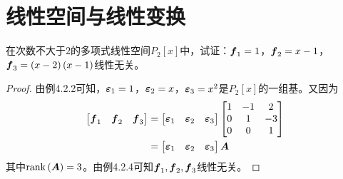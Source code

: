 \section{线性空间与线性变换}

\begin{problem}
在次数不大于\(2\)的多项式线性空间\(P_2[x]\)中，试证：\(\boldsymbol{f}_1=1\)，\(\boldsymbol{f}_2=x-1\)，\(\boldsymbol{f}_3=\left( x-2 \right)\left( x-1 \right)\)线性无关。
\end{problem}
\begin{proof}
    由例4.2.2可知，\(\boldsymbol{\varepsilon}_1=1\)，\(\boldsymbol{\varepsilon}_2=x\)，\(\boldsymbol{\varepsilon}_3=x^2\)是\(P_2[x]\)的一组基。又因为
    \begin{align*}
        \begin{bmatrix}
            \boldsymbol{f}_1 & \boldsymbol{f}_2 & \boldsymbol{f}_3
        \end{bmatrix}
         & =
        \begin{bmatrix}
            \boldsymbol{\varepsilon}_1 & \boldsymbol{\varepsilon}_2 & \boldsymbol{\varepsilon}_3
        \end{bmatrix}
        \begin{bmatrix}
            1 & -1 & 2  \\
            0 & 1  & -3 \\
            0 & 0  & 1
        \end{bmatrix} \\
         & =
        \begin{bmatrix}
            \boldsymbol{\varepsilon}_1 & \boldsymbol{\varepsilon}_2 & \boldsymbol{\varepsilon}_3
        \end{bmatrix}\boldsymbol{A}
    \end{align*}
    其中\(\mathrm{rank}\left( \boldsymbol{A} \right)=3\)。由例4.2.4可知\(\boldsymbol{f}_1,\boldsymbol{f}_2,\boldsymbol{f}_3\)线性无关。
\end{proof}

